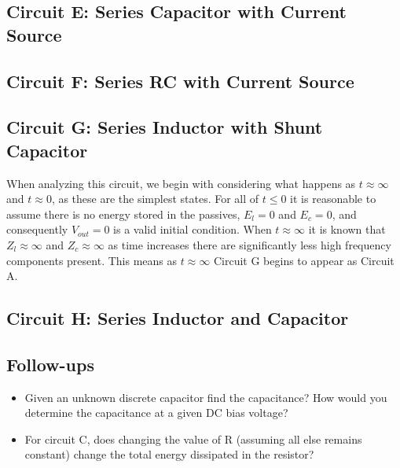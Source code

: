 \documentclass[main.tex]{subfiles}
\begin{document}
\subsection{Circuit E: Series Capacitor with Current Source}

\subsection{Circuit F: Series RC with Current Source}

\subsection{Circuit G: Series Inductor with Shunt Capacitor}
When analyzing this circuit, we begin with considering what happens as $t \approx \infty$ and $t \approx 0$, as these are the simplest states. For all of $t \leq 0$ it is reasonable to assume there is no energy stored in the passives, $E_l = 0$ and $E_c = 0$, and consequently $V_{out} = 0$ is a valid initial condition. When $t \approx \infty$ it is known that $Z_l \approx \infty$ and $Z_c \approx \infty$ as time increases there are significantly less high frequency components present. This means as $t \approx \infty$ Circuit G begins to appear as Circuit A. 





\subsection{Circuit H: Series Inductor and Capacitor}


\subsection{Follow-ups}
\begin{itemize}
    \item Given an unknown discrete capacitor find the capacitance? How would you determine the capacitance at a given DC bias voltage? %
    \item For circuit C, does changing the value of R (assuming all else remains constant) change the total energy dissipated in the resistor? %
\end{itemize}
\end{document}
